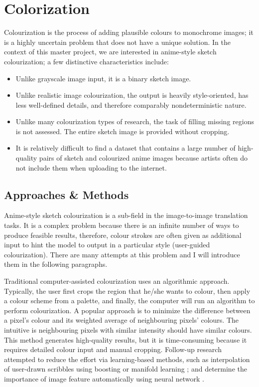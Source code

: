 \chapter{Colorization}
\label{chapterlabel3}

Colourization is the process of adding plausible colours to monochrome images; it is a highly uncertain problem that does not have a unique solution. In the context of this master project, we are interested in anime-style sketch colourization; a few distinctive characteristics include:

\begin{itemize}
    \item Unlike grayscale image input, it is a binary sketch image.
    \item Unlike realistic image colourization, the output is heavily style-oriented, has less well-defined details, and therefore comparably nondeterministic nature.
    \item Unlike many colourization types of research, the task of filling missing regions is not assessed. The entire sketch image is provided without cropping.
    \item It is relatively difficult to find a dataset that contains a large number of high-quality pairs of sketch and colourized anime images because artists often do not include them when uploading to the internet.
\end{itemize}


\section{Approaches \& Methods}
Anime-style sketch colourization is a sub-field in the image-to-image translation tasks. It is a complex problem because there is an infinite number of ways to produce feasible results, therefore, colour strokes are often given as additional input to hint the model to output in a particular style (user-guided colourization). There are many attempts at this problem and I will introduce them in the following paragraphs.

Traditional computer-assisted colourization uses an algorithmic approach. Typically, the user first crops the region that he/she wants to colour, then apply a colour scheme from a palette, and finally, the computer will run an algorithm to perform colourization. A popular approach is to minimize the difference between a pixel's colour and its weighted average of neighbouring pixels' colours.\cite{levinColorizationUsingOptimizationb} The intuitive is neighbouring pixels with similar intensity should have similar colours. This method generates high-quality results, but it is time-consuming because it requires detailed colour input and manual cropping. Follow-up research attempted to reduce the effort via learning-based methods, such as interpolation of user-drawn scribbles using boosting \cite{liScribbleBoostAddingClassification2008} or manifold learning \cite{chenManifoldPreservingEdit2012}; and determine the importance of image feature automatically using neural network \cite{endoDeepPropExtractingDeep2016}.


